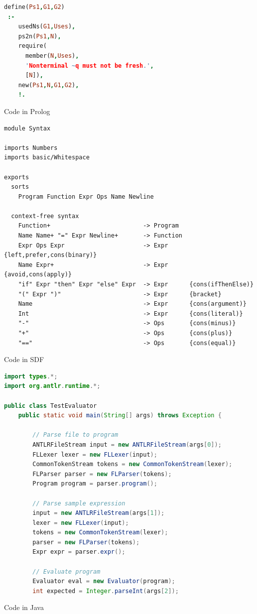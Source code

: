 \documentclass{uvamscse}
\begin{document}
\begin{sourcecode}
\begin{lstlisting}[language=prolog]
define(Ps1,G1,G2)
 :-
    usedNs(G1,Uses),
    ps2n(Ps1,N),
    require(
      member(N,Uses),
      'Nonterminal ~q must not be fresh.',
      [N]),
    new(Ps1,N,G1,G2),
    !.
\end{lstlisting}
\caption{Code in Prolog}
\end{sourcecode}

\begin{sourcecode}
\begin{lstlisting}[language=sdf]
module Syntax

imports Numbers
imports basic/Whitespace

exports
  sorts
    Program Function Expr Ops Name Newline

  context-free syntax
    Function+                          -> Program
    Name Name+ "=" Expr Newline+       -> Function
    Expr Ops Expr                      -> Expr      {left,prefer,cons(binary)}
    Name Expr+                         -> Expr      {avoid,cons(apply)}
    "if" Expr "then" Expr "else" Expr  -> Expr      {cons(ifThenElse)}
    "(" Expr ")"                       -> Expr      {bracket}
    Name                               -> Expr      {cons(argument)}
    Int                                -> Expr      {cons(literal)}
    "-"                                -> Ops       {cons(minus)}
    "+"                                -> Ops       {cons(plus)}
    "=="                               -> Ops       {cons(equal)}
\end{lstlisting}
\caption{Code in SDF}
\end{sourcecode}

\begin{sourcecode}
\begin{lstlisting}[language=Java]
import types.*;
import org.antlr.runtime.*;

public class TestEvaluator
    public static void main(String[] args) throws Exception {

        // Parse file to program
        ANTLRFileStream input = new ANTLRFileStream(args[0]);
        FLLexer lexer = new FLLexer(input);
        CommonTokenStream tokens = new CommonTokenStream(lexer);
        FLParser parser = new FLParser(tokens);
        Program program = parser.program();

        // Parse sample expression
        input = new ANTLRFileStream(args[1]);
        lexer = new FLLexer(input);
        tokens = new CommonTokenStream(lexer);
        parser = new FLParser(tokens);
        Expr expr = parser.expr();

        // Evaluate program
        Evaluator eval = new Evaluator(program);
        int expected = Integer.parseInt(args[2]);
\end{lstlisting}
\caption{Code in Java}
\end{sourcecode}
\end{document}

